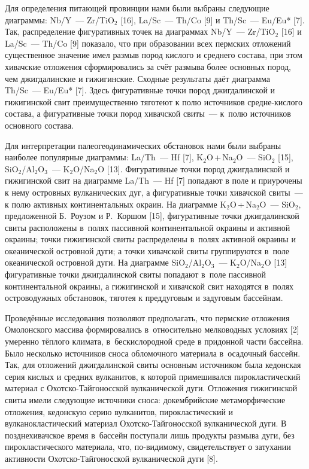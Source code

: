 Для определения питающей провинции нами были выбраны следующие диаграммы: Nb/Y~--- Zr/TiO$_2$ [16], La/Sc~--- Th/Co [9] и Th/Sc~--- Eu/Eu* [7]. Так, распределение фигуративных точек на диаграммах Nb/Y~--- Zr/TiO$_2$ [16] и La/Sc~--- Th/Co [9] показало, что при образовании всех пермских отложений существенное значение имел размыв пород кислого и среднего состава, при этом хивачские отложения сформировались за счёт размыва более основных пород, чем джигдалинские и гижигинские. Сходные результаты даёт диаграмма Th/Sc~--- Eu/Eu* [7]. Здесь фигуративные точки пород джигдалинской и гижигинской свит преимущественно тяготеют к полю источников средне-кислого состава, а фигуративные точки пород хивачской свиты~--- к~полю источников основного состава.

Для интерпретации палеогеодинамических обстановок нами были выбраны наиболее популярные диаграммы: La/Th~--- Hf [7], K$_2$O\,+\,Na$_2$O~--- SiO$_2$ [15], SiO$_2$/Al$_2$O$_3$~--- K$_2$O/Na$_2$O [13]. Фигуративные точки пород джигдалинской и гижигинской свит на диаграмме La/Th~--- Hf [7] попадают в поле и приурочены к нему островных вулканических дуг, а фигуративные точки хивачской свиты~--- к полю активных континентальных окраин. На диаграмме K$_2$O\,+\,Na$_2$O~--- SiO$_2$, предложенной Б.~Роузом и Р.~Коршом  [15], фигуративные точки джигдалинской свиты расположены в~полях пассивной континентальной окраины и активной окраины; точки гижигинской свиты распределены в~полях активной окраины и океанической островной дуги; а точки хивачской свиты группируются в~поле океанической островной дуги. На диаграмме SiO$_2$/Al$_2$O$_3$~--- K$_2$O/Na$_2$O [13] фигуративные точки джигдалинской свиты попадают в~поле пассивной континентальной окраины, а гижигинской и хивачской свит находятся в~полях островодужных обстановок, тяготея к преддуговым и задуговым бассейнам.

Проведённые исследования позволяют предполагать, что пермские отложения Омолонского массива формировались в~относительно мелководных условиях [2] умеренно тёплого климата, в~бескислородной среде в придонной части
бассейна. Было несколько источников сноса обломочного материала в~осадочный бассейн. Так, для отложений джигдалинской свиты основным источником была кедонская серия кислых и средних вулканитов, к которой примешивался пирокластический материал с Охотско-Тайгоносской вулканической дуги. Отложения гижигинской свиты имели следующие источники сноса: докембрийские метаморфические отложения, кедонскую серию вулканитов, пирокластический и вулканокластический материал Охотско-Тайгоносской вулканической дуги. В позднехивачское время в~бассейн поступали лишь продукты размыва дуги, без пирокластического материала, что, по-видимому, свидетельствует о затухании активности Охотско-Тайгоносской вулканической дуги [8].

